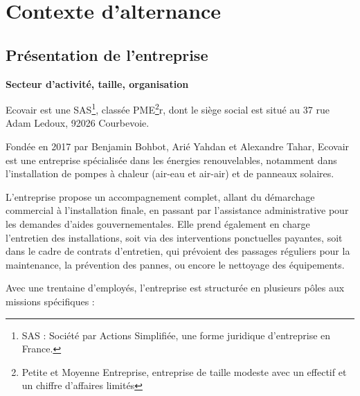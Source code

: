 

\section{Contexte d’alternance}
\label{context}

\subsection{Présentation de l’entreprise}

\textbf{Secteur d’activité, taille, organisation}\vspace{0.3cm}

Ecovair est une SAS\footnote{SAS : Société par Actions Simplifiée, une forme juridique d'entreprise en France.}, classée PME\footnote{Petite et Moyenne Entreprise, entreprise de taille modeste avec un effectif et un chiffre d'affaires limités}r, dont le siège social est situé au 37 rue Adam Ledoux, 92026 Courbevoie.

Fondée en 2017 par Benjamin Bohbot, Arié Yahdan et Alexandre Tahar, Ecovair est une entreprise spécialisée dans les énergies renouvelables, notamment dans l'installation de pompes à chaleur (air-eau et air-air) et de panneaux solaires.

L’entreprise propose un accompagnement complet, allant du démarchage commercial à l’installation finale, en passant par l’assistance administrative pour les demandes d’aides gouvernementales. Elle prend également en charge l’entretien des installations, soit via des interventions ponctuelles payantes, soit dans le cadre de contrats d’entretien, qui prévoient des passages réguliers pour la maintenance, la prévention des pannes, ou encore le nettoyage des équipements.

Avec une trentaine d’employés, l’entreprise est structurée en plusieurs pôles aux missions spécifiques :\vspace{0.3cm}

